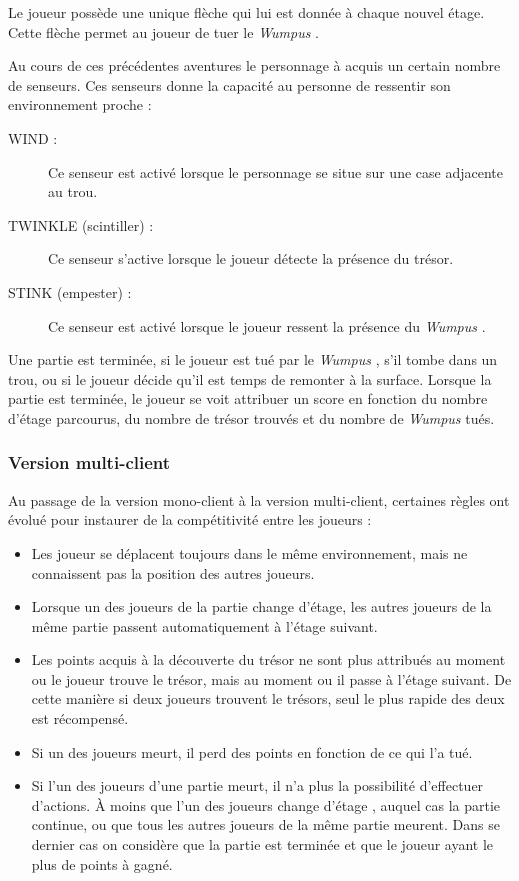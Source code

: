 \documentclass[a4paper,10pt]{article}
\newcommand{\gameName}{\emph{Wumpus }}
\begin{document}
			Le joueur possède une unique flèche qui lui est donnée à chaque nouvel étage. Cette flèche permet au joueur de tuer le \gameName.

			Au cours de ces précédentes aventures le personnage à acquis un certain nombre de senseurs.
			Ces senseurs donne la capacité au personne de ressentir son environnement proche :
			\begin{description}
			\item[WIND :] Ce senseur est activé lorsque le personnage se situe sur une case adjacente au trou.
			\item[TWINKLE (scintiller) :] Ce senseur s'active lorsque le joueur détecte la présence du trésor.
			\item[STINK (empester) :] Ce senseur est activé lorsque le joueur ressent la présence du \gameName.
			\end{description}

			Une partie est terminée, si le joueur est tué par le \gameName, s'il tombe dans un trou, ou si le joueur décide qu'il est temps de remonter à la
	surface. Lorsque la partie est terminée, le joueur se voit attribuer un score en fonction du nombre d'étage parcourus, du nombre de trésor trouvés et du
nombre	de \gameName tués.

		\subsubsection{Version multi-client}
			Au passage de la version mono-client à la version multi-client, certaines règles ont évolué pour instaurer de la compétitivité entre les joueurs :
			\begin{itemize}
				\item Les joueur se déplacent toujours dans le même environnement, mais ne connaissent pas la position des autres joueurs.
				\item Lorsque un des joueurs de la partie change d'étage, les autres joueurs de la même partie passent automatiquement à l'étage
suivant.
				\item Les points acquis à la découverte du trésor ne sont plus attribués au moment ou le joueur trouve le trésor, mais au moment ou il passe à
l'étage suivant. De cette manière si deux joueurs trouvent le trésors, seul le plus rapide des deux est récompensé.
				\item Si un des joueurs meurt, il perd des points en fonction de ce qui l'a tué.
				\item Si l'un des joueurs d'une partie meurt, il n'a plus la possibilité d'effectuer d'actions. À moins que l'un des joueurs change d'étage
, auquel cas la partie continue, ou que tous les autres joueurs de la même partie meurent. Dans se dernier cas on considère que la partie est terminée et
que le joueur ayant le plus de points à gagné.
			\end{itemize}
\end{document}
